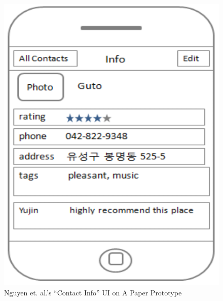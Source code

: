 \begin{figure}[!h]
\begin{centering}
\includegraphics[scale=0.5]{pics/paper_prototype_2}
\caption{Nguyen et. al.'s ``Contact Info'' UI on A Paper Prototype}\label{fig:paper_prototype_2}
\end{centering}
\end{figure}

